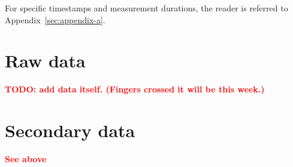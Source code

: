 For specific timestamps and measurement durations, the reader is referred to Appendix~\ref{sec:appendix-a}.

\section{Raw data}
\label{sec:raw-data}

\textbf{\textcolor{red}{TODO: add data itself. (Fingers crossed it will be this week.)}}

\section{Secondary data}
\label{sec:secondary-data}

\textbf{\textcolor{red}{See above}}